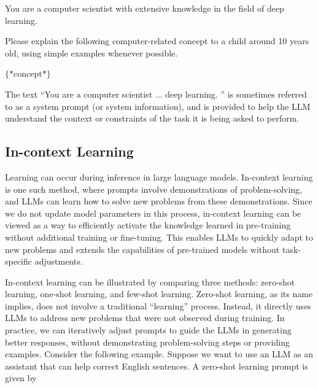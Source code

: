 \vspace{0.5em}
\begin{tcolorbox}

\begingroup
\setlength{\leftskip}{2em}
\setlength{\rightskip}{2em}

You are a computer scientist with extensive knowledge in the field of deep learning.

\vspace{0.3em}

Please explain the following computer-related concept to a child around 10 years old, using simple examples whenever possible.

\vspace{0.3em}

$\{*\mathrm{concept}*\}$

\vspace{0.3em}

\underline{\hspace{2em}}

\endgroup
\end{tcolorbox}
\vspace{0.5em}

\noindent The text ``You are a computer scientist ... deep learning. '' is sometimes referred to as a system prompt (or system information), and is provided to help the LLM understand the context or constraints of the task it is being asked to perform.

\subsection{In-context Learning}

\noindent Learning can occur during inference in large language models. In-context learning is one such method, where prompts involve demonstrations of problem-solving, and LLMs can learn how to solve new problems from these demonstrations. Since we do not update model parameters in this process, in-context learning can be viewed as a way to efficiently activate the knowledge learned in pre-training without additional training or fine-tuning. This enables LLMs to quickly adapt to new problems and extends the capabilities of pre-trained models without task-specific adjustments.

In-context learning can be illustrated by comparing three methods: zero-shot learning, one-shot learning, and few-shot learning. Zero-shot learning, as its name implies, does not involve a traditional ``learning'' process. Instead, it directly uses LLMs to address new problems that were not observed during training. In practice, we can iteratively adjust prompts to guide the LLMs in generating better responses, without demonstrating problem-solving steps or providing examples. Consider the following example. Suppose we want to use an LLM as an assistant that can help correct English sentences. A zero-shot learning prompt is given by

